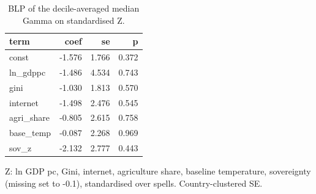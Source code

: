 \begin{table}[htbp]
\centering
\caption{BLP of the decile-averaged median Gamma on standardised Z.}
\label{tab:blp}
\begin{tabular}{lrrr}
\toprule
term & coef & se & p \\
\midrule
const & -1.576 & 1.766 & 0.372 \\
ln\_gdppc & -1.486 & 4.534 & 0.743 \\
gini & -1.030 & 1.813 & 0.570 \\
internet & -1.498 & 2.476 & 0.545 \\
agri\_share & -0.805 & 2.615 & 0.758 \\
base\_temp & -0.087 & 2.268 & 0.969 \\
sov\_z & -2.132 & 2.777 & 0.443 \\
\bottomrule
\end{tabular}
\par\smallskip\footnotesize Z: ln GDP pc, Gini, internet, agriculture share, baseline temperature, sovereignty (missing set to -0.1), standardised over spells. Country-clustered SE.
\end{table}
